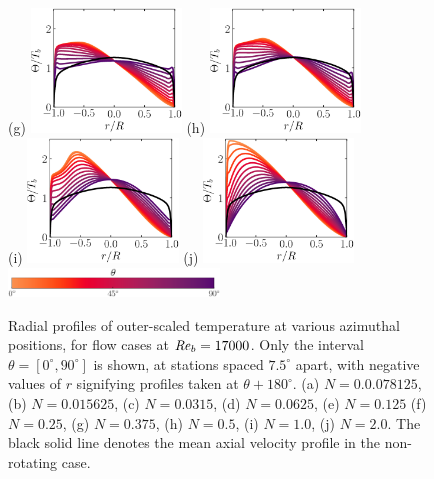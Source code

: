 \documentclass[lineno]{jfm}
\begin{document}
\begin{figure}
                (g) \includegraphics[width=4cm]{Figures/prof_tttb_rotz0_roty0.1875.eps}
                (h) \includegraphics[width=4cm]{Figures/prof_tttb_rotz0_roty0.25.eps} \\
                (i) \includegraphics[width=4cm]{Figures/prof_tttb_rotz0_roty0.5.eps}
                (j) \includegraphics[width=4cm]{Figures/prof_tttb_rotz0_roty1.0.eps} \\
                \includegraphics[width=0.5\textwidth]{Figures/theta_cmap_half.eps}
                \caption{
                Radial profiles of
                outer-scaled temperature
                at various azimuthal positions,
                for flow cases at $\mbox{\textit{Re}}_b=17000$.
                Only the interval $\theta = [0^{\circ},90^{\circ}]$ is shown, at stations
                spaced $7.5^\circ$ apart, with negative values of $r$ signifying profiles
                taken at $\theta + 180^{\circ}$.
                (a) $N = 0.0.078125$,
                (b) $N = 0.015625$,
                (c) $N = 0.0315$,
                (d) $N = 0.0625$,
                (e) $N = 0.125$
                (f) $N = 0.25$,
                (g) $N = 0.375$,
                (h) $N = 0.5$,
                (i) $N = 1.0$,
                (j) $N = 2.0$.
                The black solid line denotes the mean axial velocity profile in the
                non-rotating case.
        }
        \label{fig:tprof}
        \end{figure}
\end{document}
